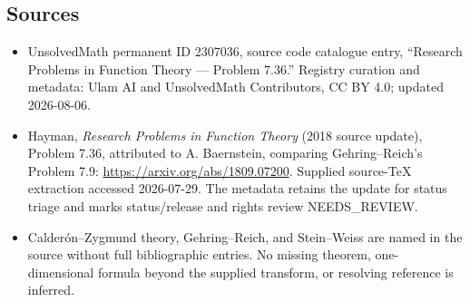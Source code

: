 \documentclass[11pt]{article}
\begin{document}
\subsection{Sources}
\begin{itemize}
\item UnsolvedMath permanent ID 2307036, source code catalogue entry, ``Research Problems in Function Theory --- Problem 7.36.'' Registry curation and metadata: Ulam AI and UnsolvedMath Contributors, CC BY 4.0; updated 2026-08-06.
\item Hayman, \emph{Research Problems in Function Theory} (2018 source update), Problem 7.36, attributed to A. Baernstein, comparing Gehring--Reich's Problem 7.9: \url{https://arxiv.org/abs/1809.07200}. Supplied source-TeX extraction accessed 2026-07-29. The metadata retains the update for status triage and marks status/release and rights review NEEDS\_REVIEW.
\item Calderón--Zygmund theory, Gehring--Reich, and Stein--Weiss are named in the source without full bibliographic entries. No missing theorem, one-dimensional formula beyond the supplied transform, or resolving reference is inferred.
\end{itemize}
\end{document}
